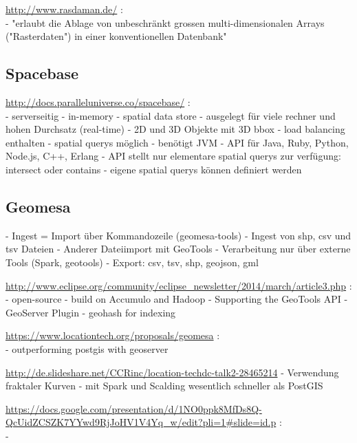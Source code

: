 \url{http://www.rasdaman.de/} :\\
- "erlaubt die Ablage von unbeschränkt grossen multi-dimensionalen Arrays ("Rasterdaten") in einer konventionellen Datenbank"


\subsection{Spacebase}

\url{http://docs.paralleluniverse.co/spacebase/} :\\
- serverseitig
- in-memory
- spatial data store
- ausgelegt für viele rechner und hohen Durchsatz (real-time)
- 2D und 3D Objekte mit 3D bbox
- load balancing enthalten
- spatial querys möglich
- benötigt JVM
- API für Java, Ruby, Python, Node.js, C++, Erlang
- API stellt nur elementare spatial querys zur verfügung: intersect oder contains
- eigene spatial querys können definiert werden

\subsection{Geomesa}

- Ingest = Import über Kommandozeile (geomesa-tools)
- Ingest von shp, csv und tsv Dateien
- Anderer Dateiimport mit GeoTools
- Verarbeitung nur über externe Tools (Spark, geotools)
- Export: csv, tsv, shp, geojson, gml

\url{http://www.eclipse.org/community/eclipse_newsletter/2014/march/article3.php} :\\
- open-source
- build on Accumulo and Hadoop
- Supporting the GeoTools API
- GeoServer Plugin
- geohash for indexing


\url{https://www.locationtech.org/proposals/geomesa} :\\
- outperforming postgis with geoserver


\url{http://de.slideshare.net/CCRinc/location-techdc-talk2-28465214}
- Verwendung fraktaler Kurven
- mit Spark und Scalding wesentlich schneller als PostGIS


\url{https://docs.google.com/presentation/d/1NO0ppk8MfDs8Q-QcUidZCSZK7YYwd9RjJoHV1V4Yq_w/edit?pli=1#slide=id.p} :\\
- 



